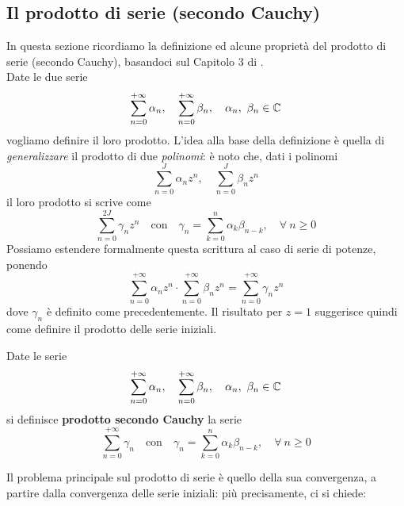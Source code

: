 \subsection{Il prodotto di serie (secondo Cauchy)}\label{prodottosecondocauchy}
In questa sezione ricordiamo la definizione ed alcune proprietà del prodotto di serie (secondo Cauchy), basandoci sul Capitolo 3 di \cite{rudin:1976principles}.\\
Date le due serie 
\begin{equation*}
	\sum_{n=0}^{+\infty} \alpha_n,\quad \sum_{n=0}^{+\infty} \beta_n,\quad \alpha_n, \ \beta_n \in \mathbb{C}
\end{equation*}
vogliamo definire il loro prodotto. L'idea alla base della definizione è quella di \textit{generalizzare} il prodotto di due \textit{polinomi}: è noto che, dati i polinomi 
\begin{equation*}
	\sum_{n=0}^{J} \alpha_n z^n,\quad \sum_{n=0}^{J} \beta_n z^n
\end{equation*}
il loro prodotto si scrive come
\begin{equation*}
	\sum_{n=0}^{2J} \gamma_n z^n\quad\text{con}\quad\gamma_n= \sum_{k=0}^{n} \alpha_k\beta_{n-k},\quad \forall \ n\geq 0
\end{equation*}
Possiamo estendere formalmente questa scrittura al caso di serie di potenze, ponendo
\begin{equation*}
	\sum_{n=0}^{+\infty} \alpha_n z^n \cdot \sum_{n=0}^{+\infty} \beta_n z^n = \sum_{n=0}^{+\infty} \gamma_n z^n
\end{equation*}
dove $\gamma_n$ è definito come precedentemente. Il risultato per $z=1$ suggerisce quindi come definire il prodotto delle serie iniziali.
\begin{define}
	Date le serie
	\begin{equation*}
		\sum_{n=0}^{+\infty} \alpha_n,\quad \sum_{n=0}^{+\infty} \beta_n,\quad \alpha_n, \ \beta_n \in \mathbb{C}
	\end{equation*}
	si definisce \textbf{prodotto secondo Cauchy} la serie
	\begin{equation*}
		\sum_{n=0}^{+\infty} \gamma_n\quad\text{con}\quad\gamma_n= \sum_{k=0}^{n} \alpha_k\beta_{n-k},\quad \forall \ n\geq 0
	\end{equation*}
\end{define}
Il problema principale sul prodotto di serie è quello della sua convergenza, a partire dalla convergenza delle serie iniziali: più precisamente, ci si chiede:
